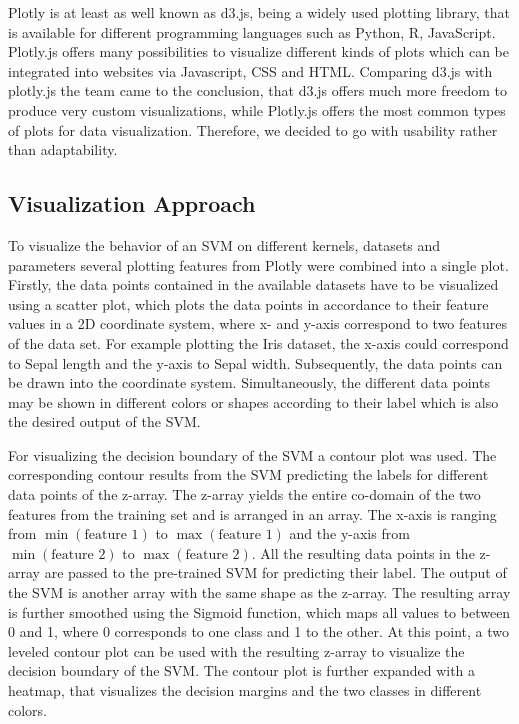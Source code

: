 \documentclass[parskip=half]{scrartcl}
\begin{document}
Plotly is at least as well known as d3.js, being a widely used plotting library, that is available for different programming languages such as Python, R, JavaScript. Plotly.js offers many possibilities to visualize different kinds of plots which can be integrated into websites via Javascript, CSS and HTML. Comparing d3.js with plotly.js the team came to the conclusion, that d3.js offers much more freedom to produce very custom visualizations, while Plotly.js offers the most common types of plots for data visualization. Therefore, we decided to go with usability rather than adaptability.

\subsection{Visualization Approach}

To visualize the behavior of an SVM on different kernels, datasets and parameters several plotting features from Plotly were combined into a single plot. 
Firstly, the data points contained in the available datasets have to be visualized using a scatter plot, which plots the data points in accordance to their feature values in a 2D coordinate system, where x- and y-axis correspond to two features of the data set. 
For example plotting the Iris dataset, the x-axis could correspond to Sepal length and the y-axis to Sepal width. Subsequently, the data points can be drawn into the coordinate system. Simultaneously, the different data points may be shown in different colors or shapes according to their label which is also the desired output of the SVM.

For visualizing the decision boundary of the SVM a contour plot was used. The
corresponding contour results from the SVM predicting the labels for different
data points of the z-array. The z-array yields the entire co-domain of the two
features from the training set and is arranged in an array.
The x-axis is ranging from $\min(\text{feature~1})$ to $\max(\text{feature~1})$
and the y-axis from $\min(\text{feature~2})$ to $\max(\text{feature~2})$.
All the resulting data points in the z-array are passed to the pre-trained SVM for predicting their label. The output of the SVM is another array with the same shape as the z-array. The resulting array is further smoothed using the Sigmoid function, which maps all values to between 0 and 1, where 0 corresponds to one class and 1 to the other. 
At this point, a two leveled contour plot can be used with the resulting z-array  to visualize the decision boundary of the SVM. The contour plot is further expanded with a heatmap, that visualizes the decision margins and the two classes in different colors.
\end{document}
